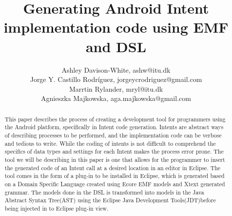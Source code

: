 \documentclass[10pt]{article}
\title{Generating Android Intent implementation code using EMF and DSL}
\author{Ashley Davison-White, ashw@itu.dk 
        \\Jorge Y. Castillo Rodríguez, jorgeycrodriguez@gmail.com
        \\Marrtin Rylander, mryl@itu.dk
        \\Agnieszka Majkowska, aga.majkowska@gmail.com
}
\begin{document}
\maketitle

\begin{abstract}
This paper describes the process of creating a development tool for programmers using the Android platform, specifically in Intent code generation.
Intents are abstract ways of describing processes to be performed, and the implementation code can be verbose and tedious to write. While the coding of intents is not difficult to comprehend the specifics of data types and settings for each Intent makes the process error prone. The tool we will be describing in this paper is one that allows for the programmer to insert the generated code of an Intent call at a desired location in an editor in Eclipse.
The tool comes in the form of a plug-in to be installed in Eclipse, which is generated based on a Domain Specific Language created using Ecore EMF models and Xtext generated grammar.
The models done in the DSL is transformed into models in the Java Abstract Syntax Tree(AST) using the Eclipse Java Development Tools(JDT)before being injected in to Eclipse plug-in view.   
\end{abstract}



















\setlength{\bibsep}{0.0pt}



%
\end{document}
